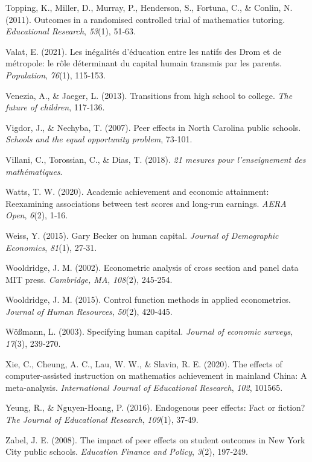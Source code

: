 \documentclass[
]{book}
\newlength{\cslhangindent}
\newlength{\cslentryspacingunit} %
\newenvironment{CSLReferences}[2] %
 {%
  \setlength{\parindent}{0pt}
  \ifodd #1
  \let\oldpar\par
  \def\par{\hangindent=\cslhangindent\oldpar}
  \fi
  \setlength{\parskip}{#2\cslentryspacingunit}
 }%
 {}
\begin{document}
\begin{CSLReferences}{1}{2}
\leavevmode{}%
Topping, K., Miller, D., Murray, P., Henderson, S., Fortuna, C., \& Conlin, N. (2011). Outcomes in a randomised controlled trial of mathematics tutoring. \emph{Educational Research}, \emph{53}(1), 51‑63.

\leavevmode{}%
Valat, E. (2021). Les in{é}galit{é}s d'{é}ducation entre les natifs des Drom et de m{é}tropole: le r{ô}le d{é}terminant du capital humain transmis par les parents. \emph{Population}, \emph{76}(1), 115‑153.

\leavevmode{}%
Venezia, A., \& Jaeger, L. (2013). Transitions from high school to college. \emph{The future of children}, 117‑136.

\leavevmode{}%
Vigdor, J., \& Nechyba, T. (2007). Peer effects in North Carolina public schools. \emph{Schools and the equal opportunity problem}, 73‑101.

\leavevmode{}%
Villani, C., Torossian, C., \& Dias, T. (2018). \emph{21 mesures pour l'enseignement des math{é}matiques}.

\leavevmode{}%
Watts, T. W. (2020). Academic achievement and economic attainment: Reexamining associations between test scores and long-run earnings. \emph{AERA Open}, \emph{6}(2), 1‑16.

\leavevmode{}%
Weiss, Y. (2015). Gary Becker on human capital. \emph{Journal of Demographic Economics}, \emph{81}(1), 27‑31.

\leavevmode{}%
Wooldridge, J. M. (2002). Econometric analysis of cross section and panel data MIT press. \emph{Cambridge, MA}, \emph{108}(2), 245‑254.

\leavevmode{}%
Wooldridge, J. M. (2015). Control function methods in applied econometrics. \emph{Journal of Human Resources}, \emph{50}(2), 420‑445.

\leavevmode{}%
Wößmann, L. (2003). Specifying human capital. \emph{Journal of economic surveys}, \emph{17}(3), 239‑270.

\leavevmode{}%
Xie, C., Cheung, A. C., Lau, W. W., \& Slavin, R. E. (2020). The effects of computer-assisted instruction on mathematics achievement in mainland China: A meta-analysis. \emph{International Journal of Educational Research}, \emph{102}, 101565.

\leavevmode{}%
Yeung, R., \& Nguyen-Hoang, P. (2016). Endogenous peer effects: Fact or fiction? \emph{The Journal of Educational Research}, \emph{109}(1), 37‑49.

\leavevmode{}%
Zabel, J. E. (2008). The impact of peer effects on student outcomes in New York City public schools. \emph{Education Finance and Policy}, \emph{3}(2), 197‑249.

\end{CSLReferences}
\end{document}
